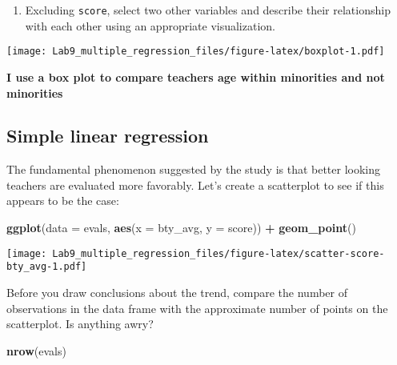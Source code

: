 \documentclass[
]{article}
\newenvironment{Shaded}{\begin{snugshade}}{\end{snugshade}}
\newcommand{\AttributeTok}[1]{\textcolor[rgb]{0.13,0.29,0.53}{#1}}
\newcommand{\FunctionTok}[1]{\textcolor[rgb]{0.13,0.29,0.53}{\textbf{#1}}}
\newcommand{\NormalTok}[1]{#1}
\newcommand{\SpecialCharTok}[1]{\textcolor[rgb]{0.81,0.36,0.00}{\textbf{#1}}}
\providecommand{\tightlist}{%
  \setlength{\itemsep}{0pt}\setlength{\parskip}{0pt}}
\begin{document}
\begin{enumerate}
\def\labelenumi{\arabic{enumi}.}
\setcounter{enumi}{2}
\tightlist
\item
  Excluding \texttt{score}, select two other variables and describe
  their relationship with each other using an appropriate visualization.
\end{enumerate}

\begin{Shaded}
\end{Shaded}

\texttt{[image: Lab9\_multiple\_regression\_files/figure-latex/boxplot-1.pdf]}

\textbf{I use a box plot to compare teachers age within minorities and
not minorities}

\subsection{Simple linear regression}\label{simple-linear-regression}

The fundamental phenomenon suggested by the study is that better looking
teachers are evaluated more favorably. Let's create a scatterplot to see
if this appears to be the case:

\begin{Shaded}
\begin{Highlighting}[]
\FunctionTok{ggplot}\NormalTok{(}\AttributeTok{data =}\NormalTok{ evals, }\FunctionTok{aes}\NormalTok{(}\AttributeTok{x =}\NormalTok{ bty\_avg, }\AttributeTok{y =}\NormalTok{ score)) }\SpecialCharTok{+}
  \FunctionTok{geom\_point}\NormalTok{()}
\end{Highlighting}
\end{Shaded}

\texttt{[image: Lab9\_multiple\_regression\_files/figure-latex/scatter-score-bty\_avg-1.pdf]}

Before you draw conclusions about the trend, compare the number of
observations in the data frame with the approximate number of points on
the scatterplot. Is anything awry?

\begin{Shaded}
\begin{Highlighting}[]
\FunctionTok{nrow}\NormalTok{(evals)}
\end{Highlighting}
\end{Shaded}
\end{document}
